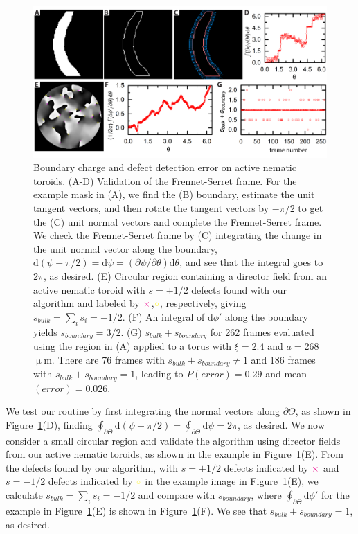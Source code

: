 \begin{figure}
  \centering
  \includegraphics{figures/C3/Ch3-Figs_EdgeChargeErr.png}
  \caption{Boundary charge and defect detection error on active nematic toroids.
  (A-D) Validation of the Frennet-Serret frame.
  For the example mask in (A), we find the (B) boundary, estimate the unit tangent vectors, and then rotate the tangent vectors by $-\pi/2$ to get the (C) unit normal vectors and complete the Frennet-Serret frame.
  We check the Frennet-Serret frame by (C) integrating the change in the unit normal vector along the boundary, $\textrm{d}(\psi - \pi/2) = \textrm{d}\psi = (\partial \psi/\partial \theta) \textrm{d}\theta$, and see that the integral goes to $2 \pi$, as desired.
  (E) Circular region containing a director field from an active nematic toroid with $s = \pm 1/2$ defects found with our algorithm and labeled by ${\color{magenta} \times}$,${\color{yellow} \circ}$, respectively, giving $s_{bulk} = \sum_i s_i = -1/2$.
  (F) An integral of $\textrm{d}\phi'$ along the boundary yields $s_{boundary} = 3/2$.
  (G) $s_{bulk} + s_{boundary}$ for 262 frames evaluated using the region in (A) applied to a torus with $\xi = 2.4$ and $a = 268$ $\upmu$m.
  There are 76 frames with $s_{bulk} + s_{boundary} \neq 1$ and 186 frames with $s_{bulk} + s_{boundary} = 1$, leading to $P(error) = 0.29$ and mean$(error) = 0.026$.}\label{f:3-EdgeChargeErr}
\end{figure}

We test our routine by first integrating the normal vectors along $\partial \Theta$, as shown in Figure~\ref{f:3-EdgeChargeErr}(D), finding $\oint_{\partial \Theta} \textrm{d}(\psi-\pi/2) = \oint_{\partial \Theta} \textrm{d}\psi = 2\pi$, as desired.
We now consider a small circular region and validate the algorithm using director fields from our active nematic toroids, as shown in the example in Figure~\ref{f:3-EdgeChargeErr}(E).
From the defects found by our algorithm, with $s = +1/2$ defects indicated by ${\color{magenta} \times}$ and $s = -1/2$ defects indicated by ${\color{yellow} \circ}$ in the example image in Figure~\ref{f:3-EdgeChargeErr}(E), we calculate $s_{bulk}= \sum\limits_i s_i=-1/2$ and compare with $s_{boundary}$, where $\oint_{\partial \Theta} \textrm{d}\phi'$ for the example in Figure~\ref{f:3-EdgeChargeErr}(E) is shown in Figure~\ref{f:3-EdgeChargeErr}(F).
We see that $s_{bulk}+s_{boundary} = 1$, as desired.

